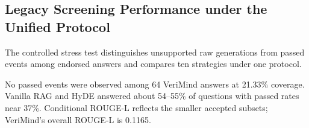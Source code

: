 \documentclass[smallextended]{svjour3}
\begin{document}
\subsection{Legacy Screening Performance under the Unified Protocol}
\label{subsec:main_results}
The controlled stress test distinguishes unsupported raw generations from passed events among endorsed answers and compares ten strategies under one protocol.

\begin{table}[H]
\centering
\caption{Controlled stress-test results on VeriMind-Bench. ROUGE-L is recomputed against the benchmark reference answer; conditional ROUGE-L is measured among accepted answers.}
\label{tab:main_results}
\renewcommand{\arraystretch}{1.15}
\end{table}
\FloatBarrier

No passed events were observed among 64 VeriMind answers at 21.33\% coverage. Vanilla RAG and HyDE answered about 54--55\% of questions with passed rates near 37\%. Conditional ROUGE-L reflects the smaller accepted subsets; VeriMind's overall ROUGE-L is 0.1165.
\end{document}
